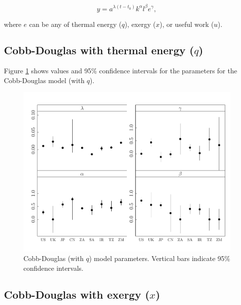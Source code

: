 \documentclass[preprint,authoryear,12pt]{elsarticle}\usepackage{graphicx, color}
\makeatletter
\def\maxwidth{ %
  \ifdim\Gin@nat@width>\linewidth
    \linewidth
  \else
    \Gin@nat@width
  \fi
}
\newenvironment{knitrout}{}{} %
\makeatother
\begin{document}
\begin{equation} \label{eq:CD_With_Energy}
  y = a^{\lambda (t-t_0)}k^{\alpha}l^{\beta}e^{\gamma},
\end{equation}

\noindent where $e$ can be any of thermal energy ($q$), exergy ($x$), or useful work ($u$).

\subsection{Cobb-Douglas with thermal energy ($q$)}

Figure \ref{fig:CDq_Params_Graph} shows values and 95\% confidence intervals for the parameters for the Cobb-Douglas model (with $q$).

\begin{knitrout}
\color{fgcolor}\begin{figure}[H]

\includegraphics[width=\maxwidth]{figure/CDq_Params_Graph} \caption[Cobb-Douglas (with $q$) model parameters]{Cobb-Douglas (with $q$) model parameters. Vertical bars indicate 95\% confidence intervals.\label{fig:CDq_Params_Graph}}
\end{figure}


\end{knitrout}


\subsection{Cobb-Douglas with exergy ($x$)}
\end{document}
